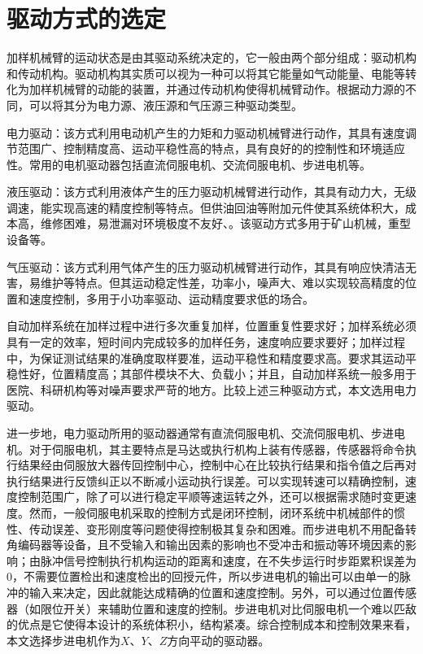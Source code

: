 \section{驱动方式的选定}

加样机械臂的运动状态是由其驱动系统决定的，它一般由两个部分组成：驱动机构和传动机构。驱动机构其实质可以视为一种可以将其它能量如气动能量、电能等转化为加样机械臂的动能的装置，并通过传动机构使得机械臂动作。根据动力源的不同，可以将其分为电力源、液压源和气压源三种驱动类型。

电力驱动：该方式利用电动机产生的力矩和力驱动机械臂进行动作，其具有速度调节范围广、控制精度高、运动平稳性高的特点，具有良好的的控制性和环境适应性。常用的电机驱动器包括直流伺服电机、交流伺服电机、步进电机等。

液压驱动：该方式利用液体产生的压力驱动机械臂进行动作，其具有动力大，无级调速，能实现高速的精度控制等特点。但供油回油等附加元件使其系统体积大，成本高，维修困难，易泄漏对环境极度不友好、。该驱动方式多用于矿山机械，重型设备等。

气压驱动：该方式利用气体产生的压力驱动机械臂进行动作，其具有响应快清洁无害，易维护等特点。但其运动稳定性差，功率小，噪声大、难以实现较高精度的位置和速度控制，多用于小功率驱动、运动精度要求低的场合。

自动加样系统在加样过程中进行多次重复加样，位置重复性要求好；加样系统必须具有一定的效率，短时间内完成较多的加样任务，速度响应要求要好；加样过程中，为保证测试结果的准确度取样要准，运动平稳性和精度要求高。要求其运动平稳性好，位置精度高；其部件模块不大、负载小；并且，自动加样系统一般多用于医院、科研机构等对噪声要求严苛的地方。比较上述三种驱动方式，本文选用电力驱动。

进一步地，电力驱动所用的驱动器通常有直流伺服电机、交流伺服电机、步进电机。对于伺服电机，其主要特点是马达或执行机构上装有传感器，传感器将命令执行结果经由伺服放大器传回控制中心，控制中心在比较执行结果和指令值之后再对执行结果进行反馈纠正以不断减小运动执行误差。可以实现转速可以精确控制，速度控制范围广，除了可以进行稳定平顺等速运转之外，还可以根据需求随时变更速度。然而，一般伺服电机采取的控制方式是闭环控制，闭环系统中机械部件的惯性、传动误差、变形刚度等问题使得控制极其复杂和困难。而步进电机不用配备转角编码器等设备，且不受输入和输出因素的影响也不受冲击和振动等环境因素的影响；由脉冲信号控制执行机构运动的距离和速度，在不失步运行时步距累积误差为0，不需要位置检出和速度检出的回授元件，所以步进电机的输出可以由单一的脉冲的输入来决定，因此就能达成精确的位置和速度控制。另外，可以通过位置传感器（如限位开关）来辅助位置和速度的控制。步进电机对比伺服电机一个难以匹敌的优点是它使得本设计的系统体积小，结构紧凑。综合控制成本和控制效果来看，本文选择步进电机作为$X$、$Y$、$Z$方向平动的驱动器。

